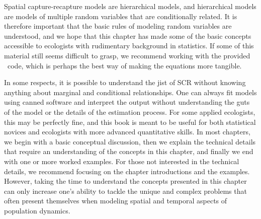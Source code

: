 Spatial capture-recapture models are hierarchical models, and hierarchical
models are models of multiple random variables that are conditionally
related. It is therefore important that the basic rules of
modeling random variables are understood, and we hope that this chapter
has made some of the basic concepts accessible to ecologists with
rudimentary background in statistics. If some of this material still
seems difficult to grasp, we recommend working with the
provided \R~code, which is perhaps the best way of making the
equations more tangible.

In some respects, it is possible
to understand the jist of SCR without knowing anything about marginal
and conditional relationships. One can always fit models using canned
software and interpret the output without understanding the guts of
the model or the details of the estimation process. For some applied
ecologists, this may be perfectly fine, and this book is meant to be
useful for both statistical novices and ecologists with more advanced
quantitative skills. In most chapters, we begin with a basic conceptual
discussion, then we explain
the technical details that require an understanding of the concepts in
this chapter, and finally we end with one or more worked examples. For
those not interested in the technical details, we recommend focusing
on the chapter introductions and the examples. However, taking the
time to understand the concepts presented in this chapter can only
increase one's ability to tackle the unique and complex problems that
often present themselves when modeling spatial and temporal aspects of
population dynamics.

